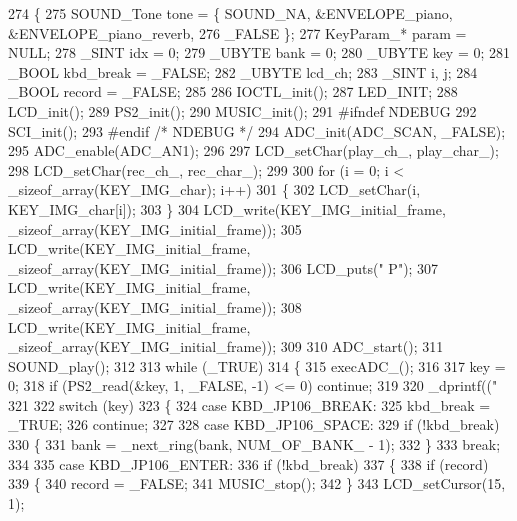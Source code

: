 \begin{DoxyCode}
274 \{
275     SOUND\_Tone tone = \{ SOUND\_NA, &ENVELOPE\_piano, &ENVELOPE\_piano\_reverb,
276                         \_FALSE \};
277     KeyParam_* param = NULL;
278     \_SINT idx = 0;
279     \_UBYTE bank = 0;
280     \_UBYTE key = 0;
281     \_BOOL kbd\_break = \_FALSE;
282     \_UBYTE lcd\_ch;
283     \_SINT i, j;
284     \_BOOL record = \_FALSE;
285 
286     IOCTL\_init();
287     LED\_INIT;
288     LCD\_init();
289     PS2\_init();
290     MUSIC\_init();
291 \textcolor{preprocessor}{#ifndef NDEBUG
}
292     SCI\_init();
293 \textcolor{preprocessor}{#endif }\textcolor{comment}{/* NDEBUG */}\textcolor{preprocessor}{}
294     ADC\_init(ADC\_SCAN, \_FALSE);
295     ADC\_enable(ADC\_AN1);
296 
297     LCD\_setChar(play\_ch\_, play\_char\_);
298     LCD\_setChar(rec\_ch\_, rec\_char\_);
299 
300     \textcolor{keywordflow}{for} (i = 0; i < \_sizeof\_array(KEY_IMG_char); i++)
301     \{
302         LCD\_setChar(i, KEY_IMG_char[i]);
303     \}
304     LCD\_write(KEY_IMG_initial_frame, \_sizeof\_array(KEY_IMG_initial_frame));
305     LCD\_write(KEY_IMG_initial_frame, \_sizeof\_array(KEY_IMG_initial_frame));
306     LCD\_puts(\textcolor{stringliteral}{" P"});
307     LCD\_write(KEY_IMG_initial_frame, \_sizeof\_array(KEY_IMG_initial_frame));
308     LCD\_write(KEY_IMG_initial_frame, \_sizeof\_array(KEY_IMG_initial_frame));
309 
310     ADC\_start();
311     SOUND\_play();
312 
313     \textcolor{keywordflow}{while} (\_TRUE)
314     \{
315         execADC\_();
316 
317         key = 0;
318         \textcolor{keywordflow}{if} (PS2\_read(&key, 1, \_FALSE, -1) <= 0) \textcolor{keywordflow}{continue};
319 
320         \_dprintf((\textcolor{stringliteral}{"%
321 
322         \textcolor{keywordflow}{switch} (key)
323         \{
324         \textcolor{keywordflow}{case} KBD\_JP106\_BREAK:
325             kbd\_break = \_TRUE;
326             \textcolor{keywordflow}{continue};
327 
328         \textcolor{keywordflow}{case} KBD\_JP106\_SPACE:
329             \textcolor{keywordflow}{if} (!kbd\_break)
330             \{
331                 bank = \_next\_ring(bank, NUM_OF_BANK_ - 1);
332             \}
333             \textcolor{keywordflow}{break};
334 
335         \textcolor{keywordflow}{case} KBD\_JP106\_ENTER:
336             \textcolor{keywordflow}{if} (!kbd\_break)
337             \{
338                 \textcolor{keywordflow}{if} (record)
339                 \{
340                     record = \_FALSE;
341                     MUSIC\_stop();
342                 \}
343                 LCD\_setCursor(15, 1);
}
\end{DoxyCode}
